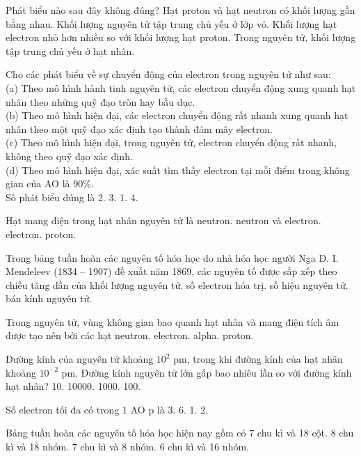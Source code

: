\documentclass[11pt,a4paper]{article}
\begin{document}
\begin{ex}
Phát biểu nào sau đây không đúng?
\choice
{Hạt proton và hạt neutron có khối lượng gần bằng nhau.}
{Khối lượng nguyên tử tập trung chủ yếu ở lớp vỏ.}
{Khối lượng hạt electron nhỏ hơn nhiều so với khối lượng hạt proton.}
{Trong nguyên tử, khối lượng tập trung chủ yếu ở hạt nhân.}
\end{ex}
\begin{ex}
Cho các phát biểu về sự chuyển động của electron trong nguyên tử như sau:\\
(a) Theo mô hình hành tinh nguyên tử, các electron chuyển động xung quanh hạt nhân theo những quỹ đạo tròn hay bầu dục.\\
(b) Theo mô hình hiện đại, các electron chuyển động rất nhanh xung quanh hạt nhân theo một quỹ đạo xác định tạo thành đám mây electron.\\
(c) Theo mô hình hiện đại, trong nguyên tử, electron chuyển động rất nhanh, không theo quỹ đạo xác định.\\
(d) Theo mô hình hiện đại, xác suất tìm thấy electron tại mỗi điểm trong không gian của AO là 90\%.\\
Số phát biểu đúng là
\choice
{2.}
{3.}
{1.}
{4.}
\end{ex}
\begin{ex}
Hạt mang điện trong hạt nhân nguyên tử là
\choice
{neutron.}
{neutron và electron.}
{electron.}
{proton.}
\end{ex}
\begin{ex}
Trong bảng tuần hoàn các nguyên tố hóa học do nhà hóa học người Nga D. I. Mendeleev (1834 -- 1907) đề xuất năm 1869, các nguyên tố được sắp xếp theo chiều tăng dần của
\choice
{khối lượng nguyên tử.}
{số electron hóa trị.}
{số hiệu nguyên tử.}
{bán kính nguyên tử.}
\end{ex}
\begin{ex}
Trong nguyên tử, vùng không gian bao quanh hạt nhân và mang điện tích âm được tạo nên bởi các hạt
\choice
{neutron.}
{electron.}
{alpha.}
{proton.}
\end{ex}
\begin{ex}
Đường kính của nguyên tử khoảng $10^2\text{ pm}$, trong khi đường kính của hạt nhân khoảng $10^{-2}\text{ pm}$. Đường kính nguyên tử lớn gấp bao nhiêu lần so với đường kính hạt nhân?
\choice
{10.}
{10000.}
{1000.}
{100.}
\end{ex}
\begin{ex}
Số electron tối đa có trong 1 AO p là
\choice
{3.}
{6.}
{1.}
{2.}
\end{ex}
\begin{ex}
Bảng tuần hoàn các nguyên tố hóa học hiện nay gồm có
\choice
{7 chu kì và 18 cột.}
{8 chu kì và 18 nhóm.}
{7 chu kì và 8 nhóm.}
{6 chu kì và 16 nhóm.}
\end{ex}
\end{document}
